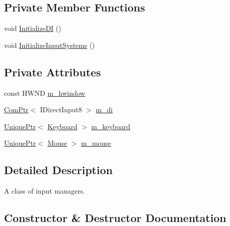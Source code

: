 \subsection*{Private Member Functions}
\begin{DoxyCompactItemize}
\item 
void \hyperlink{classmage_1_1_input_manager_aaee6f1acc558620d2cf6313f3eb36a35}{Initialize\+DI} ()
\item 
void \hyperlink{classmage_1_1_input_manager_a73ec320ef9f3809f092b98da50f99840}{Initialize\+Input\+Systems} ()
\end{DoxyCompactItemize}
\subsection*{Private Attributes}
\begin{DoxyCompactItemize}
\item 
const H\+W\+ND \hyperlink{classmage_1_1_input_manager_aebef4e7c7a12484cc68cd167ae2961bc}{m\+\_\+hwindow}
\item 
\hyperlink{namespacemage_ae74f374780900893caa5555d1031fd79}{Com\+Ptr}$<$ I\+Direct\+Input8 $>$ \hyperlink{classmage_1_1_input_manager_a0ffbd0e68b5bab33c35f310625884f3a}{m\+\_\+di}
\item 
\hyperlink{namespacemage_a8c307fbcc33bce9b7f2aa4c26c3b95cf}{Unique\+Ptr}$<$ \hyperlink{classmage_1_1_keyboard}{Keyboard} $>$ \hyperlink{classmage_1_1_input_manager_a196bdd04e169e89d0fa5f6a4a180e4cb}{m\+\_\+keyboard}
\item 
\hyperlink{namespacemage_a8c307fbcc33bce9b7f2aa4c26c3b95cf}{Unique\+Ptr}$<$ \hyperlink{classmage_1_1_mouse}{Mouse} $>$ \hyperlink{classmage_1_1_input_manager_aab9773cccf9626a7e2acb99227b42e37}{m\+\_\+mouse}
\end{DoxyCompactItemize}


\subsection{Detailed Description}
A class of input managers. 

\subsection{Constructor \& Destructor Documentation}
\hypertarget{classmage_1_1_input_manager_afc28df27a0251c242113a9761c007534}{}\label{classmage_1_1_input_manager_afc28df27a0251c242113a9761c007534} 
